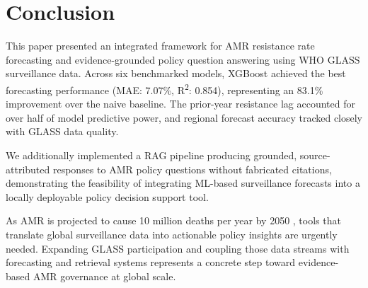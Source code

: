 \documentclass[12pt]{article}
\begin{document}
\section{Conclusion}

This paper presented an integrated framework for AMR resistance rate forecasting and evidence-grounded policy question answering using WHO GLASS surveillance data. Across six benchmarked models, XGBoost \citep{chen2016} achieved the best forecasting performance (MAE: 7.07\%, R\textsuperscript{2}: 0.854), representing an 83.1\% improvement over the naive baseline. The prior-year resistance lag accounted for over half of model predictive power, and regional forecast accuracy tracked closely with GLASS data quality.

We additionally implemented a RAG pipeline \citep{lewis2020} producing grounded, source-attributed responses to AMR policy questions without fabricated citations, demonstrating the feasibility of integrating ML-based surveillance forecasts into a locally deployable policy decision support tool.

As AMR is projected to cause 10 million deaths per year by 2050 \citep{oneill2016, dekraker2016}, tools that translate global surveillance data into actionable policy insights are urgently needed. Expanding GLASS participation and coupling those data streams with forecasting and retrieval systems represents a concrete step toward evidence-based AMR governance at global scale.



\end{document}
